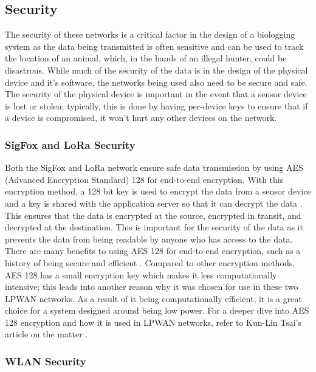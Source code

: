 \documentclass[sigplan,screen,nonacm]{acmart}
\begin{document}
\subsection{Security}
\label{subsec:Security}

The security of these networks is a critical factor in the design of a biologging system as 
the data being transmitted is often sensitive and can be used to track the location of an animal, 
which, in the hands of an illegal hunter, could be disastrous. While much of the security of the 
data is in the design of the physical device and it's software, the networks being used also need to 
be secure and safe. The security of the physical device is important in the event that a sensor 
device is lost or stolen; typically, this is done by having per-device keys to ensure that if a 
device is compromised, it won't hurt any other devices on the network.

\subsubsection{SigFox and LoRa Security}
\label{subsec:SigFox and LoRa Security}

Both the SigFox and LoRa network ensure safe data transmission by using AES (Advanced Encryption Standard) 
128 for end-to-end encryption. With this encryption method, a 128 bit key is used to encrypt the data from a 
sensor device and a key is shared with the application server so that it can decrypt the data \cite{AES128IoT}. 
This ensures that the data is encrypted at the source, encrypted in transit, and decrypted at the destination. 
This is important for the security of the data as it prevents the data 
from being readable by anyone who has access to the data. There are many benefits to using AES 128 for end-to-end encryption, such as 
a history of being secure and efficient \cite{AES128IoT}. Compared to other encryption methods, AES 128 
has a small encryption key which makes it less computationally intensive; this leads into another reason why 
it was chosen for use in these two LPWAN networks. As a result of it being computationally efficient, it is 
a great choice for a system designed around being low power. For a deeper dive into AES 128 encryption and 
how it is used in LPWAN networks, refer to Kun-Lin Tsai's article on the matter \cite{AES128IoT}.

\subsubsection{WLAN Security}
\label{subsec:WLAN Security}
\end{document}
